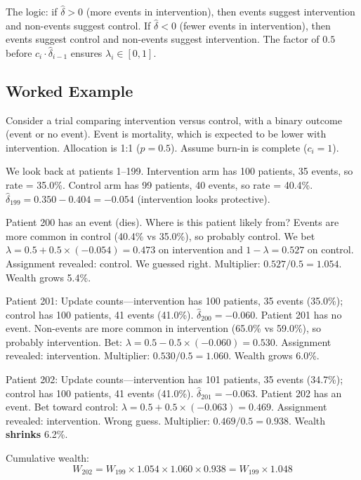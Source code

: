 \documentclass[10pt]{article}
\begin{document}
The logic: if $\hat{\delta} > 0$ (more events in intervention), then events suggest intervention and non-events suggest control. If $\hat{\delta} < 0$ (fewer events in intervention), then events suggest control and non-events suggest intervention. The factor of $0.5$ before $c_i \cdot \hat{\delta}_{i-1}$ ensures $\lambda_i \in [0, 1]$.

\subsection{Worked Example}

Consider a trial comparing intervention versus control, with a binary outcome (event or no event). Event is mortality, which is expected to be lower with intervention. Allocation is 1:1 ($p = 0.5$). Assume burn-in is complete ($c_i = 1$).

We look back at patients 1--199. Intervention arm has 100 patients, 35 events, so rate = 35.0\%. Control arm has 99 patients, 40 events, so rate = 40.4\%. $\hat{\delta}_{199} = 0.350 - 0.404 = -0.054$ (intervention looks protective).

Patient 200 has an event (dies). Where is this patient likely from? Events are more common in control (40.4\% vs 35.0\%), so probably control. We bet $\lambda = 0.5 + 0.5 \times (-0.054) = 0.473$ on intervention and $1 - \lambda = 0.527$ on control. Assignment revealed: control. We guessed right. Multiplier: $0.527 / 0.5 = 1.054$. Wealth grows 5.4\%.

Patient 201: Update counts---intervention has 100 patients, 35 events (35.0\%); control has 100 patients, 41 events (41.0\%). $\hat{\delta}_{200} = -0.060$. Patient 201 has no event. Non-events are more common in intervention (65.0\% vs 59.0\%), so probably intervention. Bet: $\lambda = 0.5 - 0.5 \times (-0.060) = 0.530$. Assignment revealed: intervention. Multiplier: $0.530 / 0.5 = 1.060$. Wealth grows 6.0\%.

Patient 202: Update counts---intervention has 101 patients, 35 events (34.7\%); control has 100 patients, 41 events (41.0\%). $\hat{\delta}_{201} = -0.063$. Patient 202 has an event. Bet toward control: $\lambda = 0.5 + 0.5 \times (-0.063) = 0.469$. Assignment revealed: intervention. Wrong guess. Multiplier: $0.469 / 0.5 = 0.938$. Wealth \textbf{shrinks} 6.2\%.

Cumulative wealth:
\begin{equation}
W_{202} = W_{199} \times 1.054 \times 1.060 \times 0.938 = W_{199} \times 1.048
\end{equation}
\end{document}
